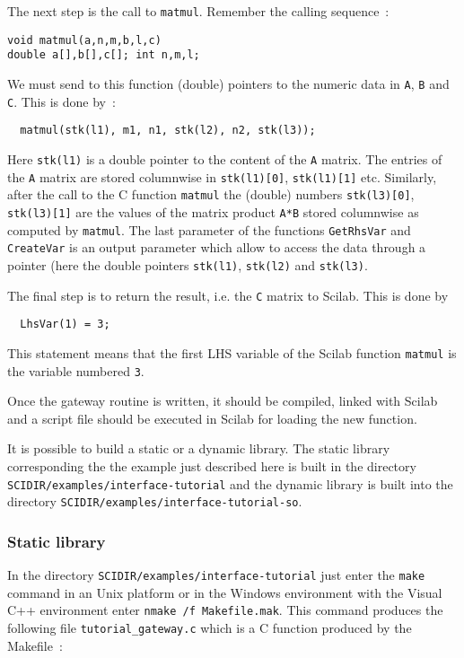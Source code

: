 The next step is the call to \verb!matmul!. Remember the calling sequence~:
\begin{verbatim}
void matmul(a,n,m,b,l,c)
double a[],b[],c[]; int n,m,l;
\end{verbatim}
\noindent
We must send to this function (double) pointers to the numeric
data in \verb!A!, \verb!B! and \verb!C!.
This is done by~:
\begin{verbatim}
  matmul(stk(l1), m1, n1, stk(l2), n2, stk(l3));
\end{verbatim}
Here \verb!stk(l1)! is a double pointer to the content of the \verb!A!
matrix. The entries of the \verb!A! matrix are stored columnwise
in \verb!stk(l1)[0]!, \verb!stk(l1)[1]! etc.
Similarly, after the call to the C function \verb!matmul! the (double) numbers
\verb!stk(l3)[0]!, \verb!stk(l3)[1]! are the values of the 
matrix product \verb!A*B! stored columnwise as computed by
\verb!matmul!.
The last parameter of the functions \verb!GetRhsVar! and \verb!CreateVar!
is an output parameter which allow to access the data through a 
pointer (here the double pointers \verb!stk(l1)!, \verb!stk(l2)! and
\verb!stk(l3)!.

The final step is to return the result, i.e. the \verb!C! matrix to Scilab.
This is done by
\begin{verbatim}
  LhsVar(1) = 3;
\end{verbatim}
\noindent This statement means that the first LHS variable of 
the Scilab function \verb!matmul! is the variable numbered \verb!3!.

Once the gateway routine is written, it should be compiled, linked
with Scilab and a script file should be executed in Scilab
for loading the new function.

It is possible to build a static or a dynamic library.  The static library
corresponding the the example just described here is built in the directory
\verb!SCIDIR/examples/interface-tutorial! and the dynamic library is built 
into the directory \verb!SCIDIR/examples/interface-tutorial-so!.
\subsubsection{Static library}
In the directory \verb!SCIDIR/examples/interface-tutorial! just 
enter the \verb!make! command in an Unix platform or in the Windows
environment with the Visual C++ environment enter \verb!nmake /f Makefile.mak!.
This command produces the following file \verb!tutorial_gateway.c! which is
a C function produced by the Makefile~:

